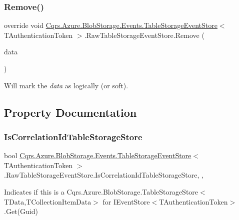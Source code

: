 \subsubsection{\texorpdfstring{Remove()}{Remove()}}
{\footnotesize\ttfamily override void \hyperlink{classCqrs_1_1Azure_1_1BlobStorage_1_1Events_1_1TableStorageEventStore}{Cqrs.\+Azure.\+Blob\+Storage.\+Events.\+Table\+Storage\+Event\+Store}$<$ T\+Authentication\+Token $>$.Raw\+Table\+Storage\+Event\+Store.\+Remove (\begin{DoxyParamCaption}\item[{\hyperlink{classCqrs_1_1Events_1_1EventData}{Event\+Data}}]{data }\end{DoxyParamCaption})}



Will mark the {\itshape data}  as logically (or soft). 



\subsection{Property Documentation}
\mbox{\label{classCqrs_1_1Azure_1_1BlobStorage_1_1Events_1_1TableStorageEventStore_1_1RawTableStorageEventStore_a566f4821980b2ca77f12f88d010beff2_a566f4821980b2ca77f12f88d010beff2}} 
\subsubsection{\texorpdfstring{Is\+Correlation\+Id\+Table\+Storage\+Store}{IsCorrelationIdTableStorageStore}}
{\footnotesize\ttfamily bool \hyperlink{classCqrs_1_1Azure_1_1BlobStorage_1_1Events_1_1TableStorageEventStore}{Cqrs.\+Azure.\+Blob\+Storage.\+Events.\+Table\+Storage\+Event\+Store}$<$ T\+Authentication\+Token $>$.Raw\+Table\+Storage\+Event\+Store.\+Is\+Correlation\+Id\+Table\+Storage\+Store\hspace{0.3cm}{\ttfamily [get]}, {\ttfamily [set]}, {\ttfamily [protected]}}



Indicates if this is a Cqrs.\+Azure.\+Blob\+Storage.\+Table\+Storage\+Store$<$\+T\+Data,\+T\+Collection\+Item\+Data$>$ for I\+Event\+Store$<$\+T\+Authentication\+Token$>$.\+Get(\+Guid) 

